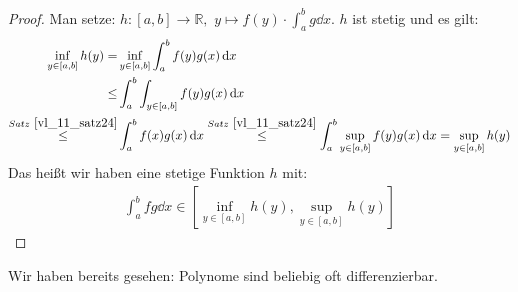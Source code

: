 \begin{proof}
 	Man setze: $h: [a,b] \rightarrow \mathbb{R},$ $y \mapsto f(y) 
	\cdot \int_a^b g \dd{x}$. $h$ ist stetig und es gilt:
	\begin{align*}
		\inf_{y \in [a,b]} h(y) = & \inf_{y \in [a,b]} \int_a^b f(y) g(x) \dd{x} \\
		\leq & \int_a^b \int_{y \in [a,b]} f(y) g(x) \dd{x} \\
		 \overset{Satz~\ref{vl_11_satz24}}{\le} & \int_a^bf(x)g(x) \dd{x} 
		\overset{Satz~\ref{vl_11_satz24}}{\le}
		\int_a^b \sup_{y \in [a,b]} f(y) g(x) \dd{x} = \sup_{y \in [a,b]} h(y)
	\end{align*}
	Das heißt wir haben eine stetige Funktion $h$ mit: 
	\begin{align*}
		\int_a^b fg\dd{x} \in [\inf_{y \in [a,b]} h(y),  \sup_{y \in [a,b]} h(y)]
	\end{align*}
\end{proof}

\begin{Bemerkung}{
	 Wir haben bereits gesehen: Polynome sind beliebig oft
	 differenzierbar.	
}\end{Bemerkung}
